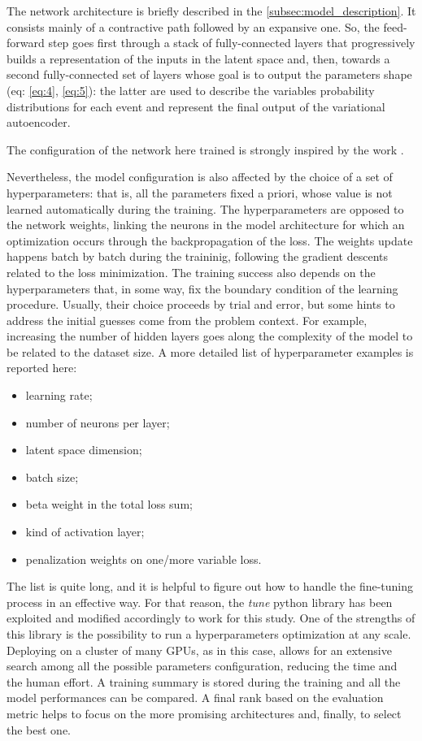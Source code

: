 The network architecture is briefly described in the \ref{subsec:model_description}. It consists mainly of a contractive path followed by an expansive one. So, the feed-forward step goes first through a stack of fully-connected layers that progressively builds a representation of the inputs in the latent space and, then, towards a second fully-connected set of layers whose goal is to output the parameters shape (eq: \ref{eq:4}, \ref{eq:5}): the latter are used to describe the variables probability distributions for each event and represent the final output of the variational autoencoder.

The configuration of the network here trained is strongly inspired by the work \cite{vae:Cerri_2019}.



Nevertheless, the model configuration is also affected by the choice of a set of hyperparameters: that is, all the parameters fixed a priori, whose value is not learned automatically during the training. The hyperparameters are opposed to the network weights, linking the neurons in the model architecture for which an optimization occurs through the backpropagation of the loss. The weights update happens batch by batch during the traininig, following the gradient descents related to the loss minimization. The training success also depends on the hyperparameters that,  in some way, fix the boundary condition of the learning procedure. Usually, their choice proceeds by trial and error, but some hints to address the initial guesses come from the problem context. For example, increasing the number of hidden layers goes along the complexity of the model to be related to the dataset size. A more detailed list of hyperparameter examples is reported here:

\begin{itemize}
\item learning rate;
\item number of neurons per layer;
\item latent space dimension;
\item batch size;
\item beta weight in the total loss sum;
\item kind of activation layer;
\item penalization weights on one/more variable loss.
\end{itemize}

The list is quite long, and it is helpful to figure out how to handle the fine-tuning process in an effective way. For that reason, the \textit{tune} python library has been exploited and modified accordingly to work for this study. One of the strengths of this library is the possibility to run a hyperparameters optimization at any scale. Deploying on a cluster of many GPUs, as in this case, allows for an extensive search among all the possible parameters configuration, reducing the time and the human effort. A training summary is stored during the training and all the model performances can be compared. A final rank based on the evaluation metric helps to focus on the more promising architectures and, finally, to select the best one.
